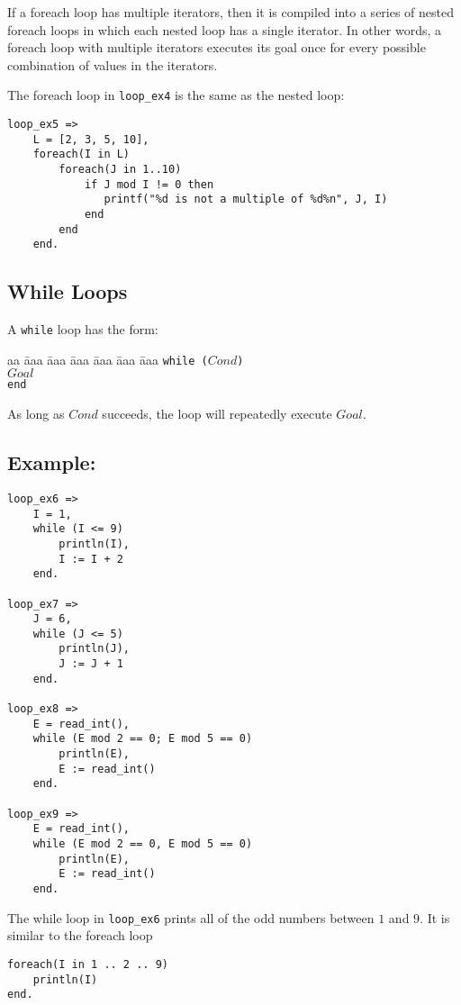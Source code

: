 If a foreach loop has multiple iterators, then it is compiled into a series of nested foreach loops in which each nested loop has a single iterator.  In other words, a foreach loop with multiple iterators executes its goal once for every possible combination of values in the iterators.

The foreach loop in \texttt{loop\_ex4} is the same as the nested loop:
\begin{verbatim}
loop_ex5 =>
    L = [2, 3, 5, 10],
    foreach(I in L)
        foreach(J in 1..10)
            if J mod I != 0 then
               printf("%d is not a multiple of %d%n", J, I)
            end
        end
    end.
\end{verbatim}

\subsection{While Loops}
A \texttt{while} loop has the form:
\begin{tabbing}
aa \= aaa \= aaa \= aaa \= aaa \= aaa \= aaa \kill
\> \texttt{while ($Cond$)} \\
\> \> $Goal$  \\
\>  \texttt{end}
\end{tabbing} 
As long as $Cond$ succeeds, the loop will repeatedly execute $Goal$.  
\subsection*{Example:}
\begin{verbatim}
loop_ex6 =>
    I = 1, 
    while (I <= 9)
        println(I),
        I := I + 2
    end.

loop_ex7 =>
    J = 6,
    while (J <= 5)
        println(J),
        J := J + 1
    end.

loop_ex8 =>
    E = read_int(),
    while (E mod 2 == 0; E mod 5 == 0)
        println(E),
        E := read_int()
    end.

loop_ex9 =>
    E = read_int(),
    while (E mod 2 == 0, E mod 5 == 0)
        println(E),
        E := read_int()
    end.
\end{verbatim}

The while loop in \texttt{loop\_ex6} prints all of the odd numbers between $1$ and $9$.  It is similar to the foreach loop
\begin{verbatim}
foreach(I in 1 .. 2 .. 9)
    println(I)
end.
\end{verbatim}

